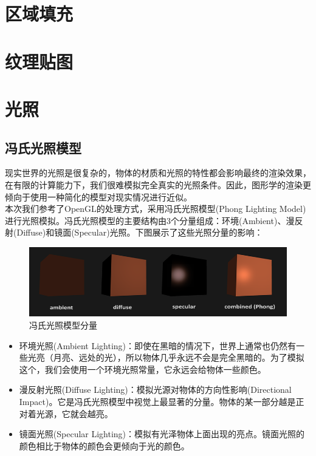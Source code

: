     \section{区域填充}

    \section{纹理贴图}
    
    \section{光照}
    \begin{spacing}{2.5}
    \subsection{冯氏光照模型}
    现实世界的光照是很复杂的，物体的材质和光照的特性都会影响最终的渲染效果，在有限的计算能力下，我们很难模拟完全真实的光照条件。因此，图形学的渲染更倾向于使用一种简化的模型对现实情况进行近似。\\
    本次我们参考了OpenGL的处理方式，采用冯氏光照模型(Phong Lighting Model)进行光照模拟。冯氏光照模型的主要结构由3个分量组成：环境(Ambient)、漫反射(Diffuse)和镜面(Specular)光照。下图展示了这些光照分量的影响：\\
    \begin{figure}[H]
    	\centering
		\includegraphics[width=1.0\textwidth]{images/phong_model.png}
		\caption{冯氏光照模型分量}
		\label{phong_model}
    \end{figure}
    
    \begin{itemize}
    	\item 环境光照(Ambient Lighting)：即使在黑暗的情况下，世界上通常也仍然有一些光亮（月亮、远处的光），所以物体几乎永远不会是完全黑暗的。为了模拟这个，我们会使用一个环境光照常量，它永远会给物体一些颜色。
    	\item 漫反射光照(Diffuse Lighting)：模拟光源对物体的方向性影响(Directional Impact)。它是冯氏光照模型中视觉上最显著的分量。物体的某一部分越是正对着光源，它就会越亮。
    	\item 镜面光照(Specular Lighting)：模拟有光泽物体上面出现的亮点。镜面光照的颜色相比于物体的颜色会更倾向于光的颜色。
    \end{itemize}
    

\end{spacing}
